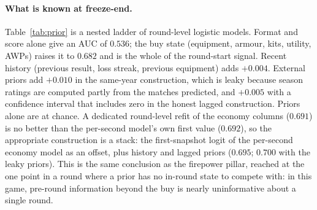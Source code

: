 \documentclass[11pt,a4paper]{article}
\begin{document}
\paragraph{What is known at freeze-end.}
Table~\ref{tab:prior} is a nested ladder of round-level logistic models. Format and score alone give an
AUC of $0.536$; the buy state (equipment, armour, kits, utility, AWPs) raises it to $0.682$ and is the
whole of the round-start signal. Recent history (previous result, loss streak, previous equipment) adds
$+0.004$. External priors add $+0.010$ in the same-year construction, which is leaky because season
ratings are computed partly from the matches predicted, and $+0.005$ with a confidence interval that
includes zero in the honest lagged construction. Priors alone are at chance. A dedicated round-level
refit of the economy columns ($0.691$) is no better than the per-second model's own first value
($0.692$), so the appropriate construction is a stack: the first-snapshot logit of the per-second
economy model as an offset, plus history and lagged priors ($0.695$; $0.700$ with the leaky priors).
This is the same conclusion as the firepower pillar, reached at the one point in a round where a prior
has no in-round state to compete with: in this game, pre-round information beyond the buy is nearly
uninformative about a single round.
\end{document}
